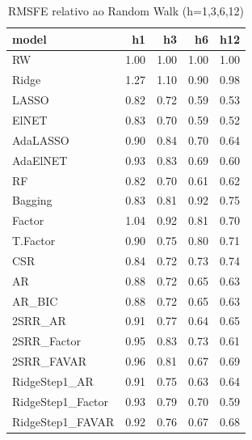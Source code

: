 \begin{table}[ht]
\centering
\begin{tabular}{lrrrr}
  \hline
model & h1 & h3 & h6 & h12 \\ 
  \hline
RW & 1.00 & 1.00 & 1.00 & 1.00 \\ 
  Ridge & 1.27 & 1.10 & 0.90 & 0.98 \\ 
  LASSO & 0.82 & 0.72 & 0.59 & 0.53 \\ 
  ElNET & 0.83 & 0.70 & 0.59 & 0.52 \\ 
  AdaLASSO & 0.90 & 0.84 & 0.70 & 0.64 \\ 
  AdaElNET & 0.93 & 0.83 & 0.69 & 0.60 \\ 
  RF & 0.82 & 0.70 & 0.61 & 0.62 \\ 
  Bagging & 0.83 & 0.81 & 0.92 & 0.75 \\ 
  Factor & 1.04 & 0.92 & 0.81 & 0.70 \\ 
  T.Factor & 0.90 & 0.75 & 0.80 & 0.71 \\ 
  CSR & 0.84 & 0.72 & 0.73 & 0.74 \\ 
  AR & 0.88 & 0.72 & 0.65 & 0.63 \\ 
  AR\_BIC & 0.88 & 0.72 & 0.65 & 0.63 \\ 
  2SRR\_AR & 0.91 & 0.77 & 0.64 & 0.65 \\ 
  2SRR\_Factor & 0.95 & 0.83 & 0.73 & 0.61 \\ 
  2SRR\_FAVAR & 0.96 & 0.81 & 0.67 & 0.69 \\ 
  RidgeStep1\_AR & 0.91 & 0.75 & 0.63 & 0.64 \\ 
  RidgeStep1\_Factor & 0.93 & 0.79 & 0.70 & 0.59 \\ 
  RidgeStep1\_FAVAR & 0.92 & 0.76 & 0.67 & 0.68 \\ 
   \hline
\end{tabular}
\caption{RMSFE relativo ao Random Walk (h=1,3,6,12)} 
\label{tab:rmsfe_rw}
\end{table}
